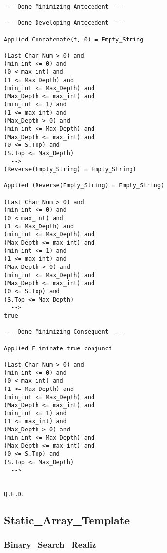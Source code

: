 \begin{lstlisting}[language=resolve]
--- Done Minimizing Antecedent ---

--- Done Developing Antecedent ---

Applied Concatenate(f, 0) = Empty_String

(Last_Char_Num > 0) and
(min_int <= 0) and
(0 < max_int) and
(1 <= Max_Depth) and
(min_int <= Max_Depth) and
(Max_Depth <= max_int) and
(min_int <= 1) and
(1 <= max_int) and
(Max_Depth > 0) and
(min_int <= Max_Depth) and
(Max_Depth <= max_int) and
(0 <= S.Top) and
(S.Top <= Max_Depth)
  -->
(Reverse(Empty_String) = Empty_String)

Applied (Reverse(Empty_String) = Empty_String)

(Last_Char_Num > 0) and
(min_int <= 0) and
(0 < max_int) and
(1 <= Max_Depth) and
(min_int <= Max_Depth) and
(Max_Depth <= max_int) and
(min_int <= 1) and
(1 <= max_int) and
(Max_Depth > 0) and
(min_int <= Max_Depth) and
(Max_Depth <= max_int) and
(0 <= S.Top) and
(S.Top <= Max_Depth)
  -->
true

--- Done Minimizing Consequent ---

Applied Eliminate true conjunct

(Last_Char_Num > 0) and
(min_int <= 0) and
(0 < max_int) and
(1 <= Max_Depth) and
(min_int <= Max_Depth) and
(Max_Depth <= max_int) and
(min_int <= 1) and
(1 <= max_int) and
(Max_Depth > 0) and
(min_int <= Max_Depth) and
(Max_Depth <= max_int) and
(0 <= S.Top) and
(S.Top <= Max_Depth)
  -->


Q.E.D.
\end{lstlisting}

	\subsection{Static\_Array\_Template}	%

		\subsubsection{Binary\_Search\_Realiz}	%

